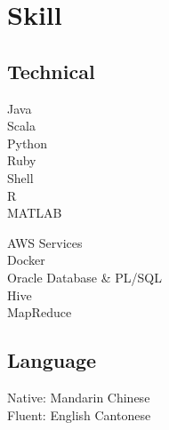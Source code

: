 \documentclass[]{deedy-resume-openfont}
\begin{document}
\begin{minipage}[t]{0.35\textwidth}

\section{Skill}
\subsection{Technical}
\minigap
{}
Java \\
Scala \\
Python \\
Ruby \\
Shell \\
R \\
MATLAB
\minigap

AWS Services \\
Docker \\
Oracle Database \& PL/SQL \\
Hive \\
MapReduce
\sectionsep

\subsection{Language}
Native: Mandarin Chinese \\
Fluent: English \textbullet{} Cantonese


%
%

\end{minipage} 
\hfill
\end{document}
